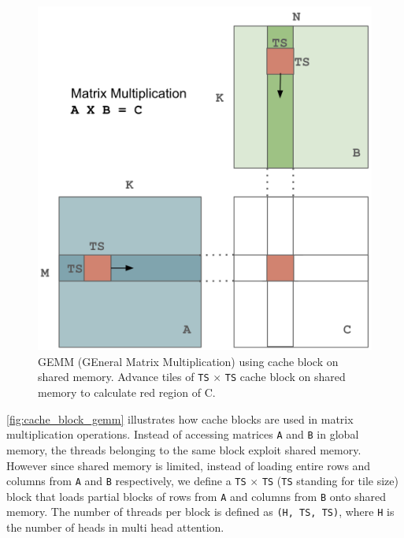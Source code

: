 \documentclass[11pt]{article}
\begin{document}
\begin{figure}[t]
  \centering
  \includegraphics[width=\linewidth]{figures/cache_block_gemm.png}
  \caption{GEMM (GEneral Matrix Multiplication) using cache block on shared memory. Advance tiles of \texttt{TS} $\times$ \texttt{TS} cache block on shared memory to calculate red region of C.}
 \label{fig:cache_block_gemm}
\end{figure}

\autoref{fig:cache_block_gemm} illustrates how cache blocks are used in matrix multiplication operations. Instead of accessing matrices \texttt{A} and \texttt{B} in global memory, the threads belonging to the same block exploit shared memory. However since shared memory is limited, instead of loading entire rows and columns from \texttt{A} and \texttt{B} respectively, we define a \texttt{TS} $\times$ \texttt{TS} (\texttt{TS} standing for tile size) block that loads partial blocks of rows from \texttt{A} and columns from \texttt{B} onto shared memory. The number of threads per block is defined as \texttt{(H, TS, TS)}, where \texttt{H} is the number of heads in multi head attention.
\end{document}
